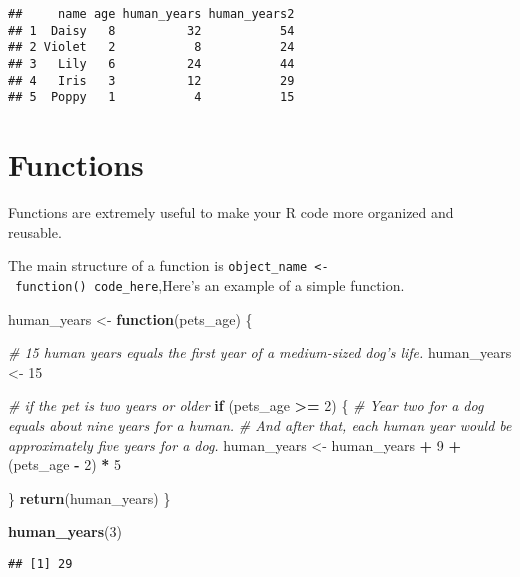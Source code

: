 \documentclass[]{book}
\newenvironment{Shaded}{\begin{snugshade}}{\end{snugshade}}
\newcommand{\CommentTok}[1]{\textcolor[rgb]{0.56,0.35,0.01}{\textit{#1}}}
\newcommand{\ControlFlowTok}[1]{\textcolor[rgb]{0.13,0.29,0.53}{\textbf{#1}}}
\newcommand{\DecValTok}[1]{\textcolor[rgb]{0.00,0.00,0.81}{#1}}
\newcommand{\KeywordTok}[1]{\textcolor[rgb]{0.13,0.29,0.53}{\textbf{#1}}}
\newcommand{\NormalTok}[1]{#1}
\newcommand{\OperatorTok}[1]{\textcolor[rgb]{0.81,0.36,0.00}{\textbf{#1}}}
\newcommand{\StringTok}[1]{\textcolor[rgb]{0.31,0.60,0.02}{#1}}
\begin{document}
\begin{verbatim}
##     name age human_years human_years2
## 1  Daisy   8          32           54
## 2 Violet   2           8           24
## 3   Lily   6          24           44
## 4   Iris   3          12           29
## 5  Poppy   1           4           15
\end{verbatim}

\hypertarget{functions}{%
\section{Functions}\label{functions}}

Functions are extremely useful to make your R code more organized and reusable.

The main structure of a function is \texttt{object\_name\ \textless{}-\ function()\ code\_here},Here's an example of a simple function.

\begin{Shaded}
\begin{Highlighting}[]
\NormalTok{human_years <-}\StringTok{ }\ControlFlowTok{function}\NormalTok{(pets_age) \{}

  \CommentTok{# 15 human years equals the first year of a medium-sized dog's life.}
\NormalTok{  human_years <-}\StringTok{ }\DecValTok{15}
  
  \CommentTok{# if the pet is two years or older}
  \ControlFlowTok{if}\NormalTok{ (pets_age }\OperatorTok{>=}\StringTok{ }\DecValTok{2}\NormalTok{) \{}
    \CommentTok{# Year two for a dog equals about nine years for a human.}
    \CommentTok{# And after that, each human year would be approximately five years for a dog.}
\NormalTok{    human_years <-}\StringTok{ }\NormalTok{human_years }\OperatorTok{+}\StringTok{ }\DecValTok{9} \OperatorTok{+}\StringTok{ }\NormalTok{(pets_age }\OperatorTok{-}\StringTok{ }\DecValTok{2}\NormalTok{) }\OperatorTok{*}\StringTok{ }\DecValTok{5}
    
\NormalTok{  \} }
  \KeywordTok{return}\NormalTok{(human_years)}
\NormalTok{\}}

\KeywordTok{human_years}\NormalTok{(}\DecValTok{3}\NormalTok{)}
\end{Highlighting}
\end{Shaded}

\begin{verbatim}
## [1] 29
\end{verbatim}

\begin{Shaded}
\end{Shaded}
\end{document}
